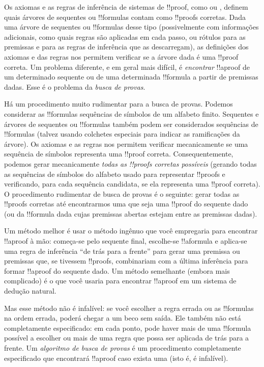 \documentclass[../../../include/open-logic-section]{subfiles}
\begin{document}


Os axiomas e as regras de inferência de sistemas de !!{proof}, como
 ou , definem quais árvores de sequentes ou
!!{formula}s contam como !!{proof}s corretas. Dada uma árvore de
sequentes ou !!{formula}s desse tipo (possivelmente com informações
adicionais, como quais regras são aplicadas em cada passo, ou rótulos
para as premissas e para as regras de inferência que as descarregam),
as definições dos axiomas e das regras nos permitem verificar se a
árvore dada é uma !!{proof} correta. Um problema diferente, e em geral
mais difícil, é \emph{encontrar} !!a{proof} de um determinado sequente
ou de uma determinada !!{formula} a partir de premissas dadas. Esse é o
problema da \emph{busca de provas}.

Há um procedimento muito rudimentar para a busca de provas. Podemos
considerar as !!{formula}s sequências de símbolos de um alfabeto
finito. Sequentes e árvores de sequentes ou !!{formula}s também podem
ser considerados sequências de !!{formula}s (talvez usando colchetes
especiais para indicar as ramificações da árvore). Os axiomas e as
regras nos permitem verificar mecanicamente se uma sequência de
símbolos representa uma !!{proof} correta. Consequentemente, podemos
gerar mecanicamente \emph{todas as !!{proof}s corretas possíveis}
(gerando todas as sequências de símbolos do alfabeto usado para
representar !!{proof}s e verificando, para cada sequência candidata, se
ela representa uma !!{proof} correta). O procedimento rudimentar de
busca de provas é o seguinte: gerar todas as !!{proof}s corretas até
encontrarmos uma que seja uma !!{proof} do sequente dado (ou da
!!{formula} dada cujas premissas abertas estejam entre as premissas
dadas).

Um método melhor é usar o método ingênuo que você empregaria para
encontrar !!a{proof} à mão: começa-se pelo sequente final, escolhe-se
!!a{formula} e aplica-se uma regra de inferência ``de trás para a
frente'' para gerar uma premissa ou premissas que, se tivessem
!!{proof}s, combinariam com a última inferência para formar !!a{proof}
do sequente dado. Um método semelhante (embora mais complicado) é o que
você usaria para encontrar !!a{proof} em um sistema de dedução natural.

Mas esse método não é infalível: se você escolher a regra errada ou as
!!{formula}s na ordem errada, poderá chegar a um beco sem saída. Ele
também não está completamente especificado: em cada ponto, pode haver
mais de uma !!{formula} possível a escolher ou mais de uma regra que
possa ser aplicada de trás para a frente. Um \emph{algoritmo de busca
de provas} é um procedimento completamente especificado que encontrará
!!a{proof} caso exista uma (isto é, é infalível).
\end{document}
